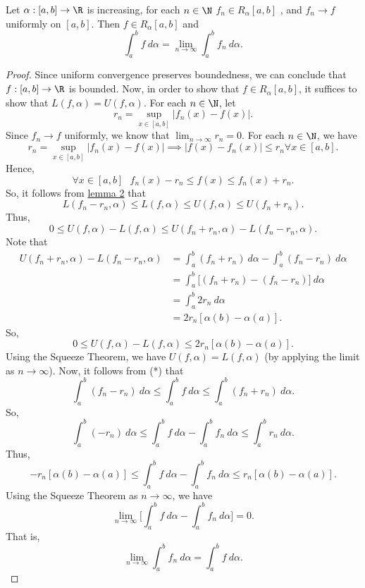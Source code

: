 \begin{theorem}[Rudin 7.16]
    Let \( \alpha: [a,b] \to \R  \) is increasing, for each \( n \in \N  \) \( {f}_{n} \in {R}_{\alpha} [a,b] \) , and \( {f}_{n} \to f  \) uniformly on \( [a,b] \). Then \( f \in {R}_{\alpha}[a,b] \) and 
    \[  \int_{ a }^{ b } f  \ d \alpha = \lim_{ n \to \infty  }  \int_{ a }^{ b } {f}_{n}  \ d \alpha. \]
\end{theorem}
\begin{proof}
    Since uniform convergence preserves boundedness, we can conclude that \( f: [a,b] \to \R  \) is bounded. Now, in order to show that \( f \in {R}_{\alpha}[a,b] \), it suffices to show that \( L(f,\alpha) = U(f,\alpha) \). For each \( n \in \N \), let 
    \[  {r}_{n} = \sup_{x \in [a,b]} | {f}_{n}(x) - f(x) |.  \]
    Since \( {f}_{n} \to f  \) uniformly, we know that \( \lim_{ n \to \infty  } {r}_{n} = 0  \). For each \( n \in \N  \), we have 
    \[  {r}_{n} = \sup_{x \in [a,b]} | {f}_{n}(x) - f(x) | \implies | f(x) - {f}_{n}(x) |  \leq {r}_{n} \forall x \in [a,b]. \]
    Hence, 
    \[  \forall x \in [a,b] \ \ \ {f}_{n}(x) - {r}_{n} \leq f(x) \leq {f}_{n}(x) + {r}_{n}. \tag{*}  \]
    So, it follows from {\hyperref[lemma 2]{lemma 2}} that 
    \[  L({f}_{n}- {r}_{n}, \alpha) \leq L(f,\alpha) \leq U(f,\alpha) \leq U({f}_{n} + {r}_{n}). \]
    Thus, 
    \[  0 \leq U(f,\alpha) - L(f,\alpha) \leq U({f}_{n} + {r}_{n}, \alpha) - L({f}_{n}-{r}_{n}, \alpha ). \]
    Note that 
    \begin{align*}
        U({f}_{n} + {r}_{n}, \alpha) - L({f}_{n}- {r}_{n}, \alpha) &= \int_{ a }^{ b } ({f}_{n} + {r}_{n})   \ d \alpha - \int_{ a }^{ b }  ({f}_{n} - {r}_{n}) \ d \alpha  \\
                                                                   &= \int_{ a }^{ b }  \Big[ ({f}_{n} + {r}_{n}) - ({f}_{n} - {r}_{n}) \Big]  \ d \alpha \\
                                                                   &= \int_{ a }^{ b } 2 {r}_{n}  \ d \alpha \\
                                                                   &= 2 {r}_{n} [\alpha(b) - \alpha(a)].
    \end{align*}
    So, 
    \[  0 \leq U(f,\alpha) - L(f,\alpha) \leq 2 {r}_{n} [\alpha(b) - \alpha(a)]. \]
    Using the Squeeze Theorem, we have \( U(f,\alpha) = L(f,\alpha) \) (by applying the limit as \( n \to \infty  \)). Now, it follows from (*) that 
    \[  \int_{ a }^{ b }  ({f}_{n}- {r}_{n})  \ d \alpha \leq \int_{ a }^{ b }  f  \ d \alpha \leq \int_{ a }^{ b }  ({f}_{n} + {r}_{n})   \ d \alpha. \]
    So, 
    \[  \int_{ a }^{ b } (-{r}_{n})  \ d \alpha \leq \int_{ a }^{ b }  f  \ d \alpha - \int_{ a }^{ b }  {f}_{n} \ d \alpha \leq \int_{ a }^{ b }  {r}_{n} \ d \alpha. \]
    Thus, 
    \[  - {r}_{n} [\alpha(b) - \alpha(a)] \leq \int_{ a }^{ b }  f  \ d \alpha - \int_{ a }^{ b }  {f}_{n}  \ d \alpha \leq {r}_{n} [\alpha(b) - \alpha(a)]. \]
    Using the Squeeze Theorem as \( n \to \infty   \), we have
    \[  \lim_{ n \to \infty  }  \Big[ \int_{ a }^{ b }  f  \ d \alpha - \int_{ a }^{ b }  {f}_{n} \ d \alpha \Big] = 0.  \]
    That is, 
    \[ \lim_{ n \to \infty   } \int_{ a }^{ b }  {f}_{n} \ d \alpha = \int_{ a }^{ b }  f  \ d \alpha. \]
    \[   \]
\end{proof}
